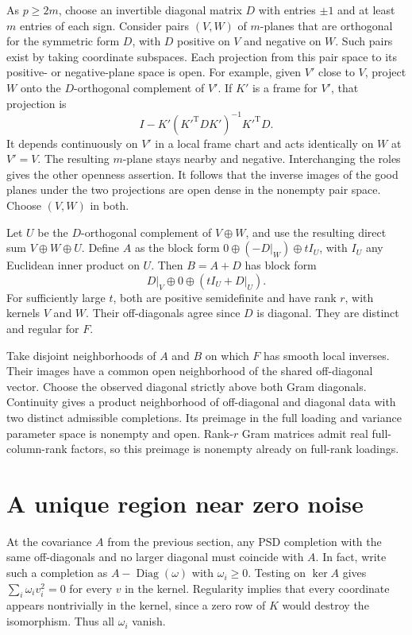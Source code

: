 \documentclass[11pt,a4paper]{amsart}
\newcommand{\Diag}{\operatorname{Diag}}
\begin{document}
As $p\ge2m$, choose an invertible diagonal matrix $D$ with entries $\pm1$ and at least $m$ entries of each sign. Consider pairs $(V,W)$ of $m$-planes that are orthogonal for the symmetric form $D$, with $D$ positive on $V$ and negative on $W$. Such pairs exist by taking coordinate subspaces. Each projection from this pair space to its positive- or negative-plane space is open. For example, given $V'$ close to $V$, project $W$ onto the $D$-orthogonal complement of $V'$. If $K'$ is a frame for $V'$, that projection is
\[
 I-K'(K'^{\mathrm T}DK')^{-1}K'^{\mathrm T}D.
\]
It depends continuously on $V'$ in a local frame chart and acts identically on $W$ at $V'=V$. The resulting $m$-plane stays nearby and negative. Interchanging the roles gives the other openness assertion. It follows that the inverse images of the good planes under the two projections are open dense in the nonempty pair space. Choose $(V,W)$ in both.

Let $U$ be the $D$-orthogonal complement of $V\oplus W$, and use the resulting direct sum $V\oplus W\oplus U$. Define $A$ as the block form $0\oplus(-D|_W)\oplus tI_U$, with $I_U$ any Euclidean inner product on $U$. Then $B=A+D$ has block form
\[
 D|_V\oplus0\oplus(tI_U+D|_U).
\]
For sufficiently large $t$, both are positive semidefinite and have rank $r$, with kernels $V$ and $W$. Their off-diagonals agree since $D$ is diagonal. They are distinct and regular for $F$.

Take disjoint neighborhoods of $A$ and $B$ on which $F$ has smooth local inverses. Their images have a common open neighborhood of the shared off-diagonal vector. Choose the observed diagonal strictly above both Gram diagonals. Continuity gives a product neighborhood of off-diagonal and diagonal data with two distinct admissible completions. Its preimage in the full loading and variance parameter space is nonempty and open. Rank-$r$ Gram matrices admit real full-column-rank factors, so this preimage is nonempty already on full-rank loadings.

\section{A unique region near zero noise}

At the covariance $A$ from the previous section, any PSD completion with the same off-diagonals and no larger diagonal must coincide with $A$. In fact, write such a completion as $A-\Diag(\omega)$ with $\omega_i\ge0$. Testing on $\ker A$ gives $\sum_i\omega_i v_i^2=0$ for every $v$ in the kernel. Regularity implies that every coordinate appears nontrivially in the kernel, since a zero row of $K$ would destroy the isomorphism. Thus all $\omega_i$ vanish.
\end{document}
